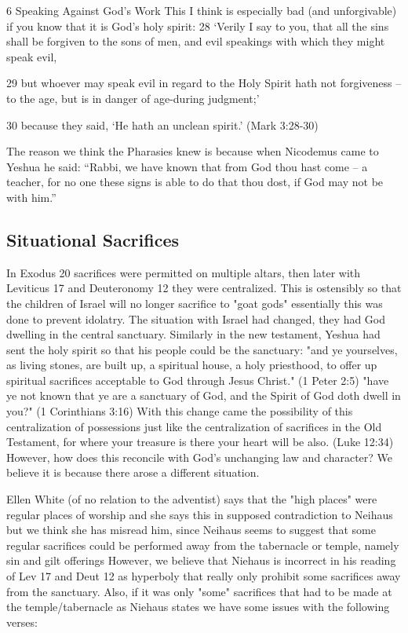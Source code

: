\documentclass[11pt]{article}
\begin{document}
{\Large 6 Speaking Against God's Work}\newline
This I think is especially bad (and unforgivable) if you know that it is God's holy spirit:
28 `Verily I say to you, that all the sins shall be forgiven to the sons of men, and evil speakings with which they might speak evil,

29 but whoever may speak evil in regard to the Holy Spirit hath not forgiveness -- to the age, but is in danger of age-during judgment;'

30 because they said, `He hath an unclean spirit.'
(Mark 3:28-30)\newline

The reason we think the Pharasies knew is because when Nicodemus came to Yeshua he said: “Rabbi, we have known that from God thou hast come -- a teacher, for no one these signs is able to do that thou dost, if God may not be with him.” \newline 
\newline

\subsection{Situational Sacrifices} \label{situational sacrifices}

In Exodus 20 sacrifices were permitted on multiple altars, then later with Leviticus 17 and Deuteronomy 12 they were centralized. This is ostensibly so that the children of Israel will no longer sacrifice to "goat gods" essentially this was done to prevent idolatry. The situation with Israel had changed, they had God dwelling in the central sanctuary. Similarly in the new testament, Yeshua had sent the holy spirit so that his people could be the sanctuary: 
"and ye yourselves, as living stones, are built up, a spiritual house, a holy priesthood, to offer up spiritual sacrifices acceptable to God through Jesus Christ." (1 Peter 2:5)
"have ye not known that ye are a sanctuary of God, and the Spirit of God doth dwell in you?" (1 Corinthians 3:16) With this change came the possibility of this centralization of possessions just like the centralization of sacrifices in the Old Testament, for where your treasure is there your heart will be also. (Luke 12:34) However, how does this reconcile with God's unchanging law and character? We believe it is because there arose a different situation. 

Ellen White (of no relation to the adventist) says that the "high places" were regular places of worship\cite{ellen white} and she says this in supposed contradiction to Neihaus but we think she has misread him, since Neihaus seems to suggest that some regular sacrifices could be performed away from the tabernacle or temple, namely sin and gilt offerings \cite{niehaus} However, we believe that Niehaus is incorrect in his reading of Lev 17 and Deut 12 as hyperboly that really only prohibit some sacrifices away from the sanctuary. Also, if it was only "some" sacrifices that had to be made at the temple/tabernacle as Niehaus states we have some issues with the following verses:
\end{document}
